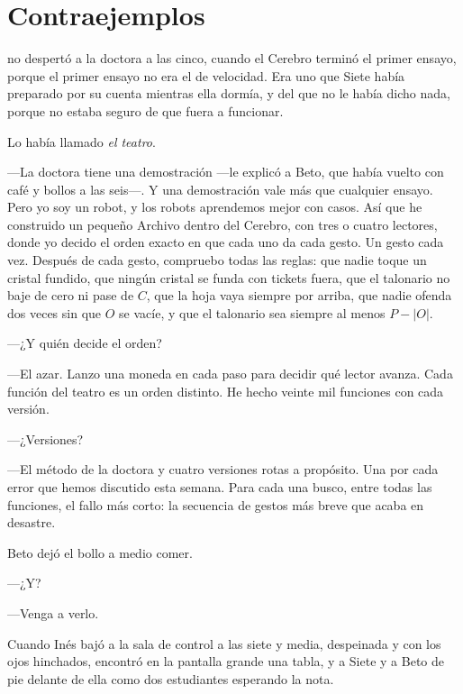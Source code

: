 \chapter{Contraejemplos}

 no despertó a la doctora a las cinco, cuando el Cerebro terminó el primer ensayo, porque el primer ensayo no era el de velocidad. Era uno que Siete había preparado por su cuenta mientras ella dormía, y del que no le había dicho nada, porque no estaba seguro de que fuera a funcionar.

Lo había llamado \emph{el teatro}.

---La doctora tiene una demostración ---le explicó a Beto, que había vuelto con café y bollos a las seis---\nobreak. Y una demostración vale más que cualquier ensayo. Pero yo soy un robot, y los robots aprendemos mejor con casos. Así que he construido un pequeño Archivo dentro del Cerebro, con tres o cuatro lectores, donde yo decido el orden exacto en que cada uno da cada gesto. Un gesto cada vez. Después de cada gesto, compruebo todas las reglas: que nadie toque un cristal fundido, que ningún cristal se funda con tickets fuera, que el talonario no baje de cero ni pase de $C$, que la hoja vaya siempre por arriba, que nadie ofenda dos veces sin que $O$ se vacíe, y que el talonario sea siempre al menos $P - |O|$.

---¿Y quién decide el orden?

---El azar. Lanzo una moneda en cada paso para decidir qué lector avanza. Cada función del teatro es un orden distinto. He hecho veinte mil funciones con cada versión.

---¿Versiones?

---El método de la doctora y cuatro versiones rotas a propósito. Una por cada error que hemos discutido esta semana. Para cada una busco, entre todas las funciones, el fallo más corto: la secuencia de gestos más breve que acaba en desastre.

Beto dejó el bollo a medio comer.

---¿Y?

---Venga a verlo.

\escena
Cuando Inés bajó a la sala de control a las siete y media, despeinada y con los ojos hinchados, encontró en la pantalla grande una tabla, y a Siete y a Beto de pie delante de ella como dos estudiantes esperando la nota.

